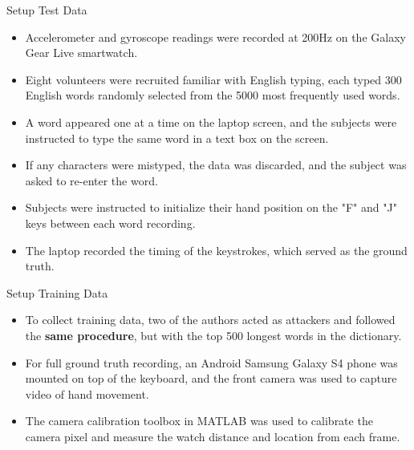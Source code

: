 \documentclass[ucs,9pt]{beamer}
\begin{document}
\begin{frame}{Setup Test Data}
\begin{itemize}
	\item Accelerometer and gyroscope readings were recorded at 200Hz on the Galaxy Gear Live smartwatch.
	\item 	Eight volunteers were recruited familiar with English typing, each typed 300 English words randomly selected from the 5000 most frequently used words. %
	\item A word appeared one at a time on the laptop screen, and the subjects were instructed to type the same word in a text box on the screen.
	\item If any characters were mistyped, the data was discarded, and the subject was asked to re-enter the word. 
	\item Subjects were instructed to initialize their hand position on the "F" and "J" keys between each word recording. 
	\item The laptop recorded the timing of the keystrokes, which served as the ground truth.
\end{itemize}
\end{frame}

\begin{frame}{Setup Training Data}
	\begin{itemize}
		\item To collect training data, two of the authors acted as attackers and followed the \textbf{same procedure}, but with the top 500 longest words in the dictionary.
		\item For full ground truth recording, an Android Samsung Galaxy S4 phone was mounted on top of the keyboard, and the front camera was used to capture video of hand movement. 
		\item The camera calibration toolbox in MATLAB was used to calibrate the camera pixel and measure the watch distance and location from each frame.
	\end{itemize}
\end{frame}
\end{document}

